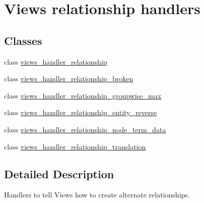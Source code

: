 \hypertarget{group__views__relationship__handlers}{
\section{Views relationship handlers}
\label{group__views__relationship__handlers}
}
\subsection*{Classes}
\begin{DoxyCompactItemize}
\item 
class \hyperlink{classviews__handler__relationship}{views\_\-handler\_\-relationship}
\item 
class \hyperlink{classviews__handler__relationship__broken}{views\_\-handler\_\-relationship\_\-broken}
\item 
class \hyperlink{classviews__handler__relationship__groupwise__max}{views\_\-handler\_\-relationship\_\-groupwise\_\-max}
\item 
class \hyperlink{classviews__handler__relationship__entity__reverse}{views\_\-handler\_\-relationship\_\-entity\_\-reverse}
\item 
class \hyperlink{classviews__handler__relationship__node__term__data}{views\_\-handler\_\-relationship\_\-node\_\-term\_\-data}
\item 
class \hyperlink{classviews__handler__relationship__translation}{views\_\-handler\_\-relationship\_\-translation}
\end{DoxyCompactItemize}


\subsection{Detailed Description}
Handlers to tell Views how to create alternate relationships. 